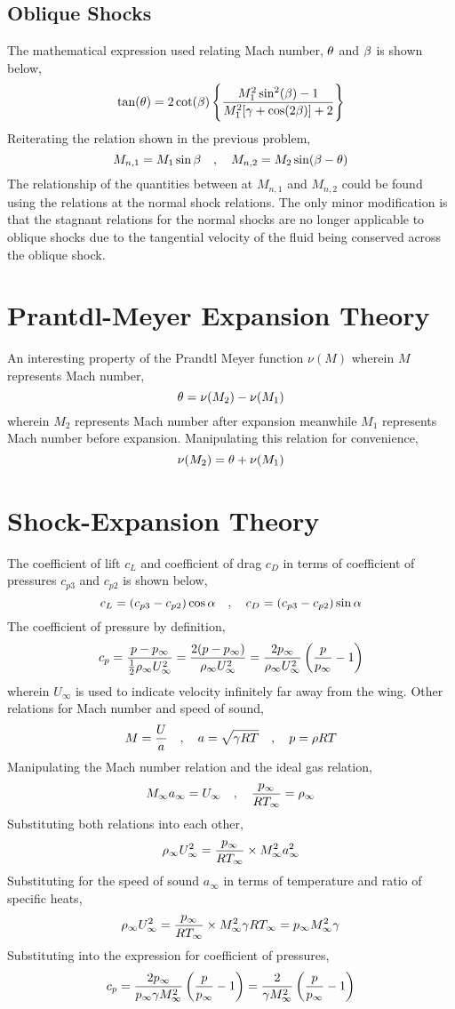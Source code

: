 \documentclass[a4paper, 12pt]{report}
\begin{document}
\begin{center}
\subsection{Oblique Shocks}
\begin{comment}
\end{comment}
The mathematical expression used relating Mach number, $\theta$ and $\beta$ is shown below,
$$\tan(\theta) = 2\cot(\beta)\left\{\frac{M_1^2\sin^2(\beta) - 1}{M_1^2[\gamma+\cos(2\beta)]+2}\right\}$$
Reiterating the relation shown in the previous problem,
$$M_{n,1} = M_1\sin\beta \quad,\quad M_{n,2} = M_2\sin(\beta-\theta)$$
The relationship of the quantities between at $M_{n,1}$ and $M_{n,2}$ could be found using the relations at the normal shock relations. The only minor modification is that the stagnant relations for the normal shocks are no longer applicable to oblique shocks due to the tangential velocity of the fluid being conserved across the oblique shock.
\section{Prantdl-Meyer Expansion Theory}
\begin{comment}
\end{comment}
An interesting property of the Prandtl Meyer function $\nu(M)$ wherein $M$ represents Mach number,
$$\theta = \nu(M_2) - \nu(M_1)$$
wherein $M_2$ represents Mach number after expansion meanwhile $M_1$ represents Mach number before expansion. Manipulating this relation for convenience,
$$\nu(M_2) = \theta + \nu(M_1)$$
\section{Shock-Expansion Theory}
\begin{comment}
\end{comment}
The coefficient of lift $c_L$ and coefficient of drag $c_D$ in terms of coefficient of pressures $c_{p3}$ and $c_{p2}$ is shown below,
$$c_L = (c_{p3}-c_{p2})\cos\alpha \quad,\quad c_D = (c_{p3}-c_{p2})\sin\alpha$$
The coefficient of pressure by definition,
$$c_p = \frac{p-p_\infty}{\frac{1}{2}\rho_\infty U_\infty^2} = \frac{2(p-p_\infty)}{\rho_\infty U_\infty^2} = \frac{2 p_\infty}{\rho_\infty U_\infty^2}\left(\frac{p}{p_\infty}-1\right)$$
wherein $U_\infty$ is used to indicate velocity infinitely far away from the wing. Other relations for Mach number and speed of sound,
$$M=\frac{U}{a} \quad,\quad a = \sqrt{\gamma RT} \quad,\quad p=\rho R T$$
Manipulating the Mach number relation and the ideal gas relation,
$$M_\infty a_\infty = U_\infty \quad,\quad \frac{p_\infty}{R T_\infty} = \rho_\infty $$
Substituting both relations into each other,
$$\rho_\infty U_\infty^2 = \frac{p_\infty}{R T_\infty}\times M_\infty^2 a_\infty^2$$
Substituting for the speed of sound $a_\infty$ in terms of temperature and ratio of specific heats,
$$\rho_\infty U_\infty^2 = \frac{p_\infty}{R T_\infty}\times M_\infty^2 \gamma R T_\infty = p_\infty M_\infty^2 \gamma $$
Substituting into the expression for coefficient of pressures,
$$c_p = \frac{2 p_\infty}{p_\infty \gamma M_\infty^2}\left(\frac{p}{p_\infty}-1\right) = \frac{2 }{\gamma M_\infty^2}\left(\frac{p}{p_\infty}-1\right)$$

\end{center}
\end{document}
